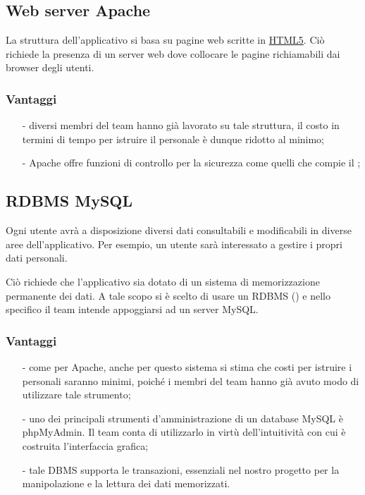  
\subsection{Web server Apache}

La struttura dell'applicativo si basa su pagine web scritte in \underline{HTML5}. Ciò richiede la presenza di un server web dove collocare le pagine richiamabili dai browser degli utenti.

\subsubsection*{Vantaggi}

\begin{itemize}[noitemsep,nolistsep]
  \item[-] diversi membri del team hanno già lavorato su tale struttura, il costo in termini di tempo per istruire il personale è dunque ridotto al minimo;
  \item[-] Apache offre funzioni di controllo per la sicurezza come quelli che compie il ;
\end{itemize}
  
\subsection{RDBMS MySQL}

Ogni utente avrà a disposizione diversi dati consultabili e modificabili in diverse aree dell'applicativo. Per esempio, un utente sarà interessato a gestire i propri dati personali.

Ciò richiede che l'applicativo sia dotato di un sistema di memorizzazione permanente dei dati. A tale scopo si è scelto di usare un RDBMS () e nello specifico  il team intende appoggiarsi ad un server MySQL\@.

\subsubsection*{Vantaggi}

\begin{itemize}[noitemsep,nolistsep]
  \item[-] come per Apache, anche per questo sistema si stima che costi per istruire i personali saranno minimi, poiché i membri del team hanno già avuto modo di utilizzare tale strumento;
  \item[-] uno dei principali strumenti d'amministrazione di un database MySQL è phpMyAdmin. Il team conta di utilizzarlo in virtù dell'intuitività con cui è costruita l'interfaccia grafica;
  \item[-] tale DBMS supporta le transazioni, essenziali nel nostro progetto per la manipolazione e la lettura dei dati memorizzati.
\end{itemize}

